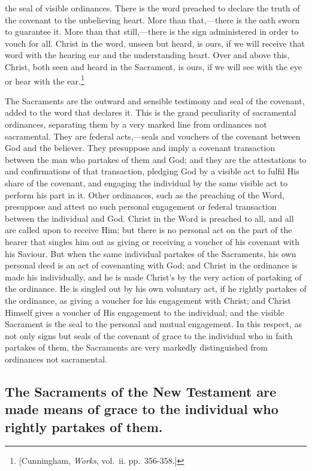 \documentclass[]{book}
\begin{document}
the seal of visible ordinances. There is the word preached to declare the truth of the covenant to the unbelieving heart. More than that,---there is the oath sworn to guarantee it. More than that still,---there is the sign administered in order to vouch for all. Christ in the word, unseen but heard, is ours, if we will receive that word with the hearing ear and the understanding heart. Over and above this, Christ, both seen and heard in the Sacrament, is ours, if we will see with the eye or hear with the ear.\footnote{{[}Cunningham, \emph{Works}, vol.~ii. pp.~356-358.{]}}

The Sacraments are the outward and sensible testimony and seal of the covenant, added to the word that declares it. This is the grand peculiarity of sacramental ordinances, separating them by a very marked line from ordinances not sacramental. They are federal acts,---seals and vouchers of the covenant between God and the believer. They presuppose and imply a covenant transaction between the man who partakes of them and God; and they are the attestations to and confirmations of that transaction, pledging God by a visible act to fulfil His share of the covenant, and engaging the individual by the same visible act to perform his part in it. Other ordinances, such as the preaching of the Word, presuppose and attest no such personal engagement or federal transaction between the individual and God. Christ in the Word is preached to all, and all are called upon to receive Him; but there is no personal act on the part of the hearer that singles him out as giving or receiving a voucher of his covenant with his Saviour. But when the same individual partakes of the Sacraments, his own personal deed is an act of covenanting with God; and Christ in the ordinance is made his individually, and he is made Christ's by the very action of partaking of the ordinance. He is singled out by his own voluntary act, if he rightly partakes of the ordinance, as giving a voucher for his engagement with Christ; and Christ Himself gives a voucher of His engagement to the individual; and the visible Sacrament is the seal to the personal and mutual engagement. In this respect, as not only signs but seals of the covenant of grace to the individual who in faith partakes of them, the Sacraments are very markedly distinguished from ordinances not sacramental.

\hypertarget{the-sacraments-of-the-new-testament-are-made-means-of-grace-to-the-individual-who-rightly-partakes-of-them.}{%
\subsection{The Sacraments of the New Testament are made means of grace to the individual who rightly partakes of them.}\label{the-sacraments-of-the-new-testament-are-made-means-of-grace-to-the-individual-who-rightly-partakes-of-them.}}
\end{document}
